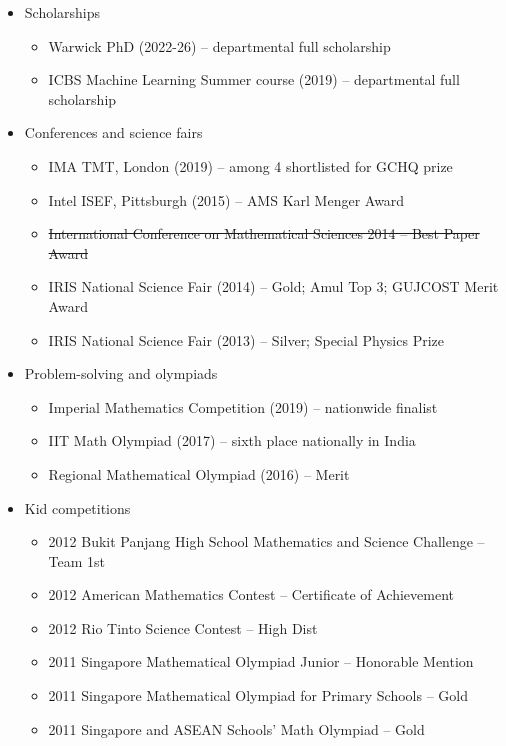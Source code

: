 \documentclass{article}
\newcommand{\disown}[1]{\sout{#1}}
\begin{document}
{\begin{itemize}
    \item Scholarships
    \begin{itemize}
        \item Warwick PhD (2022-26) -- departmental full scholarship
        \item ICBS Machine Learning Summer course (2019) -- departmental full scholarship
    \end{itemize}
    \item Conferences and science fairs
    \begin{itemize}
        \item IMA TMT, London (2019) -- among 4 shortlisted for GCHQ prize
        \item Intel ISEF, Pittsburgh (2015) -- AMS Karl Menger Award
        \item \disown{International Conference on Mathematical Sciences 2014 -- Best Paper Award}
        \item IRIS National Science Fair (2014) -- Gold; Amul Top 3; GUJCOST Merit Award
        \item IRIS National Science Fair (2013) -- Silver; Special Physics Prize
    \end{itemize}
    \item Problem-solving and olympiads
    \begin{itemize}
        \item Imperial Mathematics Competition (2019) -- nationwide finalist
        \item IIT Math Olympiad (2017) -- sixth place nationally in India
        \item Regional Mathematical Olympiad (2016) -- Merit
    \end{itemize}
    \item Kid competitions
    \begin{itemize}
        \item 2012 Bukit Panjang High School Mathematics and Science Challenge -- Team 1st
        \item 2012 American Mathematics Contest -- Certificate of Achievement
        \item 2012 Rio Tinto Science Contest -- High Dist
        \item 2011 Singapore Mathematical Olympiad Junior -- Honorable Mention
        \item 2011 Singapore Mathematical Olympiad for Primary Schools -- Gold
        \item 2011 Singapore and ASEAN Schools' Math Olympiad -- Gold

\end{itemize}
\end{itemize}}
\end{document}
